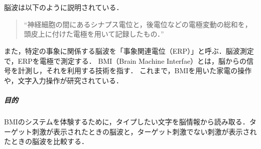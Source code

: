 \chapter{\kadaie}
\section{\purpose}
脳波は以下のように説明されている．
\begin{quote}
    ``神経細胞の間にあるシナプス電位と，後電位などの電極変動の総和を，頭皮上に付けた電極を用いて記録したもの．''
    \\\hfill\cite{自己心理学セミナー}
\end{quote}
また，特定の事象に関係する脳波を「事象関連電位（ERP）」と呼ぶ．脳波測定で，ERPを電極で測定する．
BMI（Brain Machine Interfae）とは，脳からの信号を計測し，それを利用する技術を指す\cite{脳波による実用的なBMI研究開発}．
これまで，BMIを用いた家電の操作や，文字入力操作が研究されている\cite{脳波による実用的なBMI研究開発}．
\paragraph{目的}BMIのシステムを体験するために，タイプしたい文字を脳情報から読み取る．ターゲット刺激が表示されたときの脳波と，ターゲット刺激でない刺激が表示されたときの脳波を比較する．
\section{\method}
